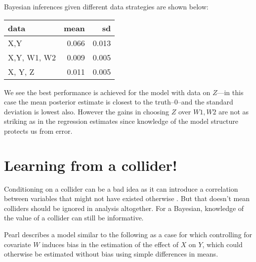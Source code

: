 \documentclass[
  12pt,
]{book}
\newenvironment{Shaded}{\begin{snugshade}}{\end{snugshade}}
\newcommand{\DataTypeTok}[1]{\textcolor[rgb]{0.13,0.29,0.53}{#1}}
\newcommand{\DecValTok}[1]{\textcolor[rgb]{0.00,0.00,0.81}{#1}}
\newcommand{\KeywordTok}[1]{\textcolor[rgb]{0.13,0.29,0.53}{\textbf{#1}}}
\newcommand{\NormalTok}[1]{#1}
\newcommand{\OperatorTok}[1]{\textcolor[rgb]{0.81,0.36,0.00}{\textbf{#1}}}
\newcommand{\OtherTok}[1]{\textcolor[rgb]{0.56,0.35,0.01}{#1}}
\newcommand{\StringTok}[1]{\textcolor[rgb]{0.31,0.60,0.02}{#1}}
\begin{document}
Bayesian inferences given different data strategies are shown below:

\begin{tabular}{l|r|r}
\hline
data & mean & sd\\
\hline
X,Y & 0.066 & 0.013\\
\hline
X,Y, W1, W2 & 0.009 & 0.005\\
\hline
X, Y, Z & 0.011 & 0.005\\
\hline
\end{tabular}

We see the best performance is achieved for the model with data on \(Z\)---in this case the mean posterior estimate is closest to the truth--0--and the standard deviation is lowest also. However the gains in choosing \(Z\) over \(W1, W2\) are not as striking as in the regression estimates since knowledge of the model structure protects us from error.

\hypertarget{learning-from-a-collider}{%
\section{Learning from a collider!}\label{learning-from-a-collider}}

Conditioning on a collider can be a bad idea as it can introduce a correlation between variables that might not have existed otherwise \citep{elwert2014endogenous}. But that doesn't mean colliders should be ignored in analysis altogether. For a Bayesian, knowledge of the value of a collider can still be informative.

Pearl describes a model similar to the following as a case for which controlling for covariate \(W\) induces bias in the estimation of the effect of \(X\) on \(Y\), which could otherwise be estimated without bias using simple differences in means.

\begin{Shaded}
\end{Shaded}
\end{document}
